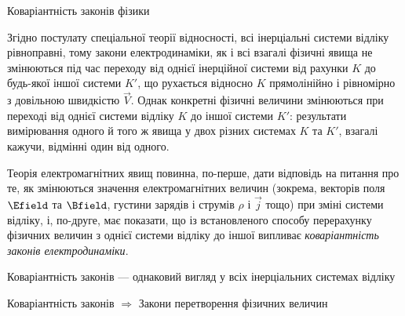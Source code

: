 \documentclass[9pt]{beamer}
\let\vect\vec
\begin{document}
\begin{frame}{Коваріантність законів фізики}{}
	\begin{block}{}\justifying\small
		Згідно постулату спеціальної теорії відносності, всі інерціальні системи відліку рівноправні, тому закони електродинаміки, як і всі взагалі фізичні явища не змінюються під час переходу від однієї інерційної системи від рахунки $ K $ до будь-якої іншої системи $ K' $, що рухається відносно $ K $ прямолінійно і рівномірно з довільною швидкістю $ \vect{V} $. Однак конкретні фізичні величини змінюються при переході від однієї системи відліку $ K $ до іншої системи $ K' $: результати вимірювання одного й того ж явища у двох різних системах $ K $ та $ K' $, взагалі кажучи, відмінні один від одного.
	\end{block}


	\begin{block}  {}\justifying\small
		Теорія електромагнітних явищ повинна, по-перше, дати відповідь на питання про те, як змінюються значення електромагнітних величин (зокрема, векторів поля $ \Efield $ та $ \Bfield $, густини зарядів і струмів $ \rho $ і $ \vect{j} $ тощо) при зміні системи відліку, і, по-друге, має показати, що із встановленого способу перерахунку фізичних величин з однієї системи відліку до іншої випливає \emph{\color{blue}коваріантність законів електродинаміки}.
	\end{block}

	\begin{alertblock}{}\centering
		Коваріантність законів --- однаковий вигляд у всіх інерціальних системах відліку
	\end{alertblock}

	\begin{alertblock}{}\centering
		Коваріантність законів $ \Rightarrow $ Закони перетворення фізичних величин
	\end{alertblock}
\end{frame}
\end{document}
